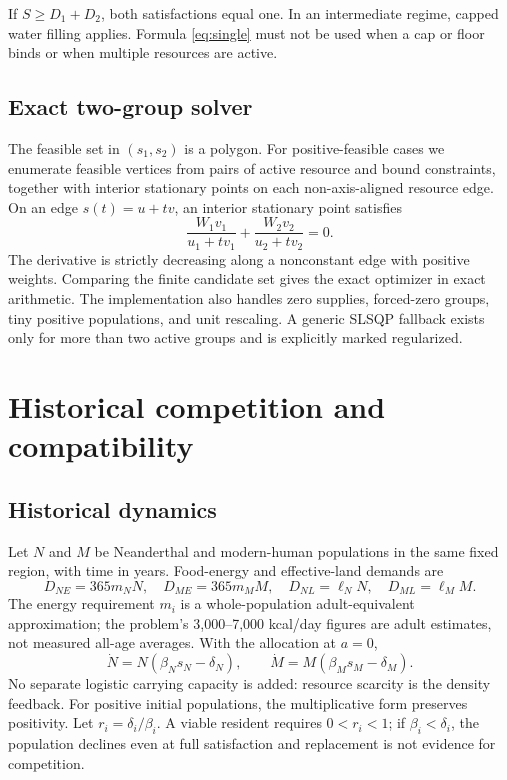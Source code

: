 \documentclass[11pt]{article}
\begin{document}
If $S\ge D_1+D_2$, both satisfactions equal one. In an intermediate regime, capped water filling applies. Formula \eqref{eq:single} must not be used when a cap or floor binds or when multiple resources are active.

\subsection{Exact two-group solver}
The feasible set in $(s_1,s_2)$ is a polygon. For positive-feasible cases we enumerate feasible vertices from pairs of active resource and bound constraints, together with interior stationary points on each non-axis-aligned resource edge. On an edge $s(t)=u+tv$, an interior stationary point satisfies
\begin{equation}
\frac{W_1v_1}{u_1+tv_1}+\frac{W_2v_2}{u_2+tv_2}=0.
\label{eq:edge}
\end{equation}
The derivative is strictly decreasing along a nonconstant edge with positive weights. Comparing the finite candidate set gives the exact optimizer in exact arithmetic. The implementation also handles zero supplies, forced-zero groups, tiny positive populations, and unit rescaling. A generic SLSQP fallback exists only for more than two active groups and is explicitly marked regularized.

\section{Historical competition and compatibility}

\subsection{Historical dynamics}
Let $N$ and $M$ be Neanderthal and modern-human populations in the same fixed region, with time in years. Food-energy and effective-land demands are
\begin{equation}
D_{NE}=365m_NN,\quad D_{ME}=365m_MM,\quad
D_{NL}=\ell_NN,\quad D_{ML}=\ell_MM.
\label{eq:histdemand}
\end{equation}
The energy requirement $m_i$ is a whole-population adult-equivalent approximation; the problem's 3,000--7,000 kcal/day figures are adult estimates, not measured all-age averages. With the allocation at $a=0$,
\begin{equation}
\dot N=N(\beta_Ns_N-\delta_N),\qquad
\dot M=M(\beta_Ms_M-\delta_M).
\label{eq:histode}
\end{equation}
No separate logistic carrying capacity is added: resource scarcity is the density feedback. For positive initial populations, the multiplicative form preserves positivity. Let $r_i=\delta_i/\beta_i$. A viable resident requires $0<r_i<1$; if $\beta_i<\delta_i$, the population declines even at full satisfaction and replacement is not evidence for competition.
\end{document}
